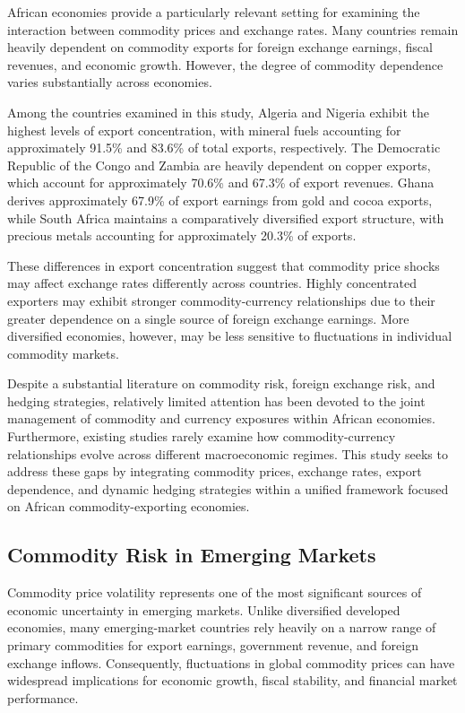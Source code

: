 \documentclass{article}
\begin{document}
African economies provide a particularly relevant setting for examining the interaction between commodity prices and exchange rates. Many countries remain heavily dependent on commodity exports for foreign exchange earnings, fiscal revenues, and economic growth. However, the degree of commodity dependence varies substantially across economies.

Among the countries examined in this study, Algeria and Nigeria exhibit the highest levels of export concentration, with mineral fuels accounting for approximately 91.5\% and 83.6\% of total exports, respectively. The Democratic Republic of the Congo and Zambia are heavily dependent on copper exports, which account for approximately 70.6\% and 67.3\% of export revenues. Ghana derives approximately 67.9\% of export earnings from gold and cocoa exports, while South Africa maintains a comparatively diversified export structure, with precious metals accounting for approximately 20.3\% of exports.

These differences in export concentration suggest that commodity price shocks may affect exchange rates differently across countries. Highly concentrated exporters may exhibit stronger commodity-currency relationships due to their greater dependence on a single source of foreign exchange earnings. More diversified economies, however, may be less sensitive to fluctuations in individual commodity markets.

Despite a substantial literature on commodity risk, foreign exchange risk, and hedging strategies, relatively limited attention has been devoted to the joint management of commodity and currency exposures within African economies. Furthermore, existing studies rarely examine how commodity-currency relationships evolve across different macroeconomic regimes. This study seeks to address these gaps by integrating commodity prices, exchange rates, export dependence, and dynamic hedging strategies within a unified framework focused on African commodity-exporting economies.

\subsection{Commodity Risk in Emerging Markets}

Commodity price volatility represents one of the most significant sources of economic uncertainty in emerging markets. Unlike diversified developed economies, many emerging-market countries rely heavily on a narrow range of primary commodities for export earnings, government revenue, and foreign exchange inflows. Consequently, fluctuations in global commodity prices can have widespread implications for economic growth, fiscal stability, and financial market performance.
\end{document}
